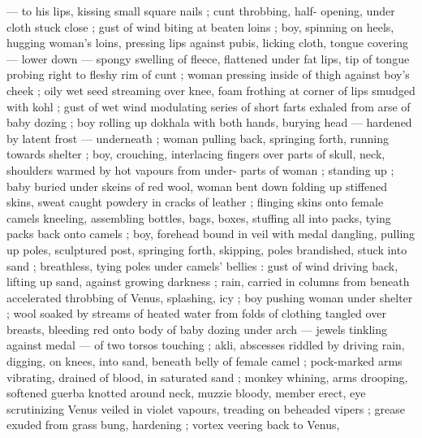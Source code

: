 --- to his lips, kissing small square nails ; cunt throbbing, half- 
opening, under cloth stuck close ; gust of wind biting at beaten loins 
; boy, spinning on heels, hugging woman's loins, pressing lips 
against pubis, licking cloth, tongue covering --- lower down --- 
spongy swelling of fleece, flattened under fat lips, tip of tongue 
probing right to fleshy rim of cunt ; woman pressing inside of thigh 
against boy's cheek ; oily wet seed streaming over knee, foam 
frothing at corner of lips smudged with kohl ; gust of wet wind 
modulating series of short farts exhaled from arse of baby dozing ; 
boy rolling up dokhala with both hands, burying head --- hardened 
by latent frost --- underneath ; woman pulling back, springing forth, 
running towards shelter ; boy, crouching, interlacing fingers over 
parts of skull, neck, shoulders warmed by hot vapours from under- 
parts of woman ; standing up ; baby buried under skeins of red wool, 
woman bent down folding up stiffened skins, sweat caught powdery 
in cracks of leather ; flinging skins onto female camels kneeling, 
assembling bottles, bags, boxes, stuffing all into packs, tying packs 
back onto camels ; boy, forehead bound in veil with medal dangling, 
pulling up poles, sculptured post, springing forth, skipping, poles 
brandished, stuck into sand ; breathless, tying poles under camels' 
bellies : gust of wind driving back, lifting up sand, against growing 
darkness ; rain, carried in columns from beneath accelerated 
throbbing of Venus, splashing, icy ; boy pushing woman under 
shelter ; wool soaked by streams of heated water from folds of 
clothing tangled over breasts, bleeding red onto body of baby 
dozing under arch --- jewels tinkling against medal --- of two torsos 
touching ; akli, abscesses riddled by driving rain, digging, on knees, 
into sand, beneath belly of female camel ; pock-marked arms 
vibrating, drained of blood, in saturated sand ; monkey whining, 
arms drooping, softened guerba knotted around neck, muzzie 
bloody, member erect, eye scrutinizing Venus veiled in violet 
vapours, treading on beheaded vipers ; grease exuded from grass 
bung, hardening ; vortex veering back to Venus, 

